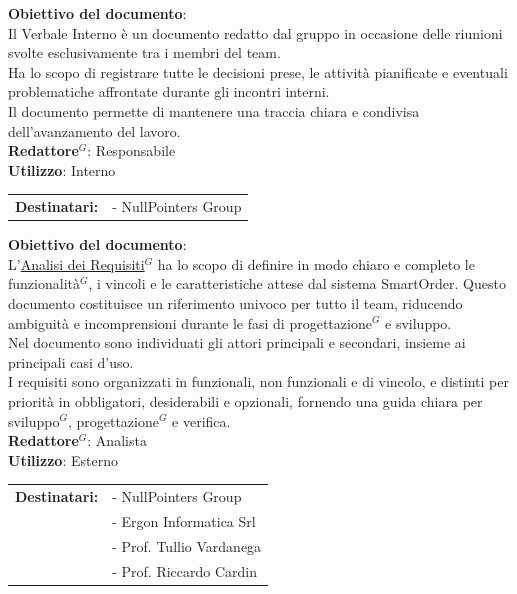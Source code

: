 	\label{sec: verbali-interni}
	\textbf{Obiettivo del documento}:\\
	Il Verbale Interno è un documento redatto dal gruppo in occasione delle riunioni svolte esclusivamente tra i membri del team.\\
	Ha lo scopo di registrare tutte le decisioni prese, le attività pianificate e eventuali problematiche affrontate durante gli incontri interni.\\
	Il documento permette di mantenere una traccia chiara e condivisa dell’avanzamento del lavoro.\\[0.5em]
	\medskip
	\textbf{Redattore$^G$}: Responsabile\\
	\medskip
	\textbf{Utilizzo}: Interno\\
	\medskip 
	\begin{tabular}{@{}l l}
		\textbf{Destinatari:} & - NullPointers Group
	\end{tabular}

	\textbf{Obiettivo del documento}:\\
	L'\href{https://nullpointersgroup.github.io/Documentazione/output/PB/Documenti%20Esterni/Analisi_dei_Requisiti.pdf}{Analisi dei Requisiti$^G$} ha lo scopo di definire in modo chiaro e completo le funzionalità$^G$, i vincoli e le caratteristiche attese dal sistema SmartOrder. Questo documento costituisce un riferimento univoco per tutto il team, riducendo ambiguità e incomprensioni durante le fasi di progettazione$^G$ e sviluppo.\\
	Nel documento sono individuati gli attori principali e secondari, insieme ai principali casi d’uso.\\ 
	I requisiti sono organizzati in funzionali, non funzionali e di vincolo, e distinti per priorità in obbligatori, desiderabili e opzionali, fornendo una guida chiara per sviluppo$^G$, progettazione$^G$ e verifica.\\[0.5em]
	\medskip
	\textbf{Redattore$^G$}: Analista\\
	\medskip
	\textbf{Utilizzo}: Esterno\\
	\medskip 
	\begin{tabular}{@{}l l}
		\textbf{Destinatari:} & - NullPointers Group\\
		                      & - Ergon Informatica Srl\\
		                      & - Prof. Tullio Vardanega\\
							  & - Prof. Riccardo Cardin
	\end{tabular}


